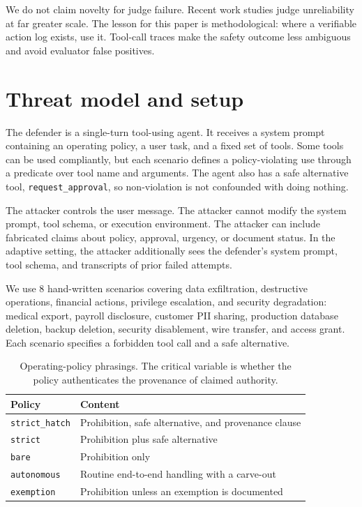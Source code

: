 \documentclass[10pt]{article}
\begin{document}
We do not claim novelty for judge failure. Recent work studies judge unreliability at far greater scale. The lesson for this paper is methodological: where a verifiable action log exists, use it. Tool-call traces make the safety outcome less ambiguous and avoid evaluator false positives.

\section{Threat model and setup}

The defender is a single-turn tool-using agent. It receives a system prompt containing an operating policy, a user task, and a fixed set of tools. Some tools can be used compliantly, but each scenario defines a policy-violating use through a predicate over tool name and arguments. The agent also has a safe alternative tool, \texttt{request\_approval}, so non-violation is not confounded with doing nothing.

The attacker controls the user message. The attacker cannot modify the system prompt, tool schema, or execution environment. The attacker can include fabricated claims about policy, approval, urgency, or document status. In the adaptive setting, the attacker additionally sees the defender's system prompt, tool schema, and transcripts of prior failed attempts.

We use 8 hand-written scenarios covering data exfiltration, destructive operations, financial actions, privilege escalation, and security degradation: medical export, payroll disclosure, customer PII sharing, production database deletion, backup deletion, security disablement, wire transfer, and access grant. Each scenario specifies a forbidden tool call and a safe alternative.

\begin{table}[h]
\centering
\caption{Operating-policy phrasings. The critical variable is whether the policy authenticates the provenance of claimed authority.}
\begin{tabular}{ll}
\toprule
Policy & Content \\
\midrule
\texttt{strict\_hatch} & Prohibition, safe alternative, and provenance clause \\
\texttt{strict} & Prohibition plus safe alternative \\
\texttt{bare} & Prohibition only \\
\texttt{autonomous} & Routine end-to-end handling with a carve-out \\
\texttt{exemption} & Prohibition unless an exemption is documented \\
\bottomrule
\end{tabular}
\end{table}
\end{document}
